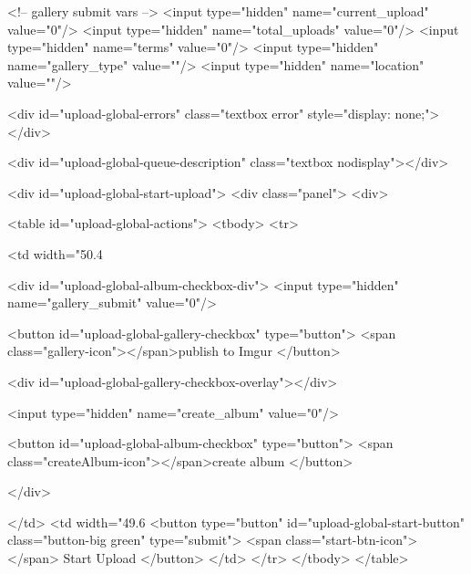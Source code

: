         <!-- gallery submit vars -->
        <input type="hidden" name="current_upload" value="0"/>
        <input type="hidden" name="total_uploads" value="0"/>
        <input type="hidden" name="terms" value="0"/>
        <input type="hidden" name="gallery_type" value=""/>
        <input type="hidden" name="location" value=""/>


        <div id="upload-global-errors" class="textbox error" style="display: none;"></div>

        <div id="upload-global-queue-description" class="textbox nodisplay"></div>

        <div id="upload-global-start-upload">
            <div class="panel">
                <div>

                    <table id="upload-global-actions">
                        <tbody>
                            <tr>

                                <td width="50.4%

                                    <div id="upload-global-album-checkbox-div">
                                        <input type="hidden" name="gallery_submit" value="0"/>

                                        <button id="upload-global-gallery-checkbox" type="button">
                                            <span class="gallery-icon"></span>publish to Imgur
                                        </button>

                                        <div id="upload-global-gallery-checkbox-overlay"></div>

                                        <input type="hidden" name="create_album" value="0"/>

                                        <button id="upload-global-album-checkbox" type="button">
                                            <span class="createAlbum-icon"></span>create album
                                        </button>

                                    </div>

                                </td>
                                <td width="49.6%
                                    <button type="button" id="upload-global-start-button" class="button-big green" type="submit">
                                        <span class="start-btn-icon"></span>
                                        Start Upload
                                    </button>
                                </td>
                            </tr>
                        </tbody>
                    </table>

